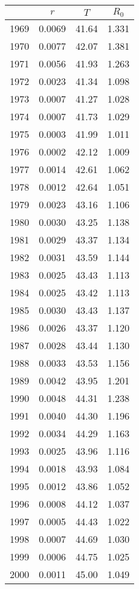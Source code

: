 \begin{tabular}{cccc}
  \hline
 & $r$ & $T$ & $R_0$ \\ 
  \hline
1969 & 0.0069 & 41.64 & 1.331 \\ 
  1970 & 0.0077 & 42.07 & 1.381 \\ 
  1971 & 0.0056 & 41.93 & 1.263 \\ 
  1972 & 0.0023 & 41.34 & 1.098 \\ 
  1973 & 0.0007 & 41.27 & 1.028 \\ 
  1974 & 0.0007 & 41.73 & 1.029 \\ 
  1975 & 0.0003 & 41.99 & 1.011 \\ 
  1976 & 0.0002 & 42.12 & 1.009 \\ 
  1977 & 0.0014 & 42.61 & 1.062 \\ 
  1978 & 0.0012 & 42.64 & 1.051 \\ 
  1979 & 0.0023 & 43.16 & 1.106 \\ 
  1980 & 0.0030 & 43.25 & 1.138 \\ 
  1981 & 0.0029 & 43.37 & 1.134 \\ 
  1982 & 0.0031 & 43.59 & 1.144 \\ 
  1983 & 0.0025 & 43.43 & 1.113 \\ 
  1984 & 0.0025 & 43.42 & 1.113 \\ 
  1985 & 0.0030 & 43.43 & 1.137 \\ 
  1986 & 0.0026 & 43.37 & 1.120 \\ 
  1987 & 0.0028 & 43.44 & 1.130 \\ 
  1988 & 0.0033 & 43.53 & 1.156 \\ 
  1989 & 0.0042 & 43.95 & 1.201 \\ 
  1990 & 0.0048 & 44.31 & 1.238 \\ 
  1991 & 0.0040 & 44.30 & 1.196 \\ 
  1992 & 0.0034 & 44.29 & 1.163 \\ 
  1993 & 0.0025 & 43.96 & 1.116 \\ 
  1994 & 0.0018 & 43.93 & 1.084 \\ 
  1995 & 0.0012 & 43.86 & 1.052 \\ 
  1996 & 0.0008 & 44.12 & 1.037 \\ 
  1997 & 0.0005 & 44.43 & 1.022 \\ 
  1998 & 0.0007 & 44.69 & 1.030 \\ 
  1999 & 0.0006 & 44.75 & 1.025 \\ 
  2000 & 0.0011 & 45.00 & 1.049 \\ 

\end{tabular}
